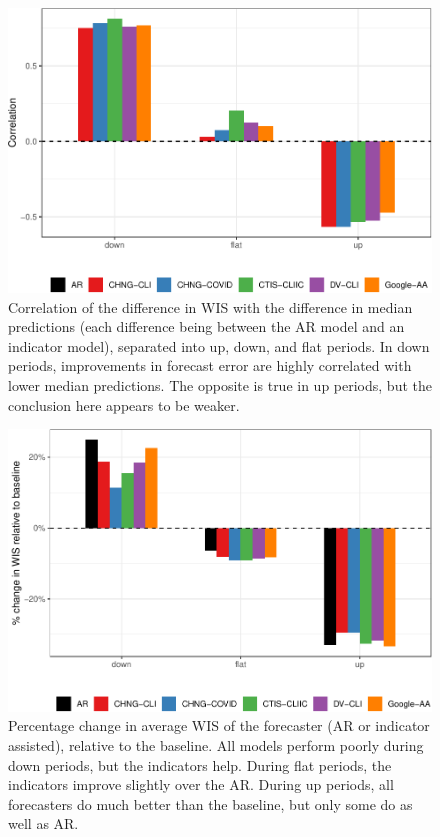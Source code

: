 \clearpage

\begin{figure}

{\centering \includegraphics[width=\textwidth]{fig/upswing-corr-table-1} 

}

\caption{Correlation of the difference in WIS with the difference in median predictions (each difference being between the AR model and an indicator model), separated into up, down, and flat periods. In down periods, improvements in forecast error are highly correlated with lower median predictions. The opposite is true in up periods, but the conclusion here appears to be weaker.}\label{fig:upswing-corr-table}
\end{figure}

\clearpage

\begin{figure}

{\centering \includegraphics[width=\textwidth]{fig/upswing-summary-remake-1} 

}

\caption{Percentage change in average WIS of the forecaster (AR or indicator assisted), relative to the baseline. All models perform poorly during down periods, but the indicators help. During flat periods, the indicators improve slightly over the AR. During up periods, all forecasters do much better than the baseline, but only some do as well as AR.}\label{fig:upswing-summary-remake}
\end{figure}

